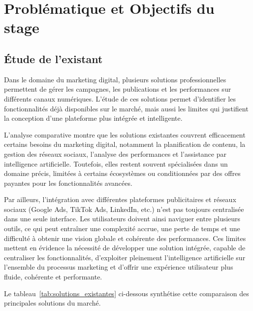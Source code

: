 \documentclass[12pt,a4paper]{report}
\numberwithin{figure}{chapter}
\numberwithin{table}{chapter}
\begin{document}
\section{Problématique et Objectifs du stage}

\subsection{Étude de l’existant}

Dans le domaine du marketing digital, plusieurs solutions professionnelles permettent de gérer les campagnes, les publications et les performances sur différents canaux numériques. L’étude de ces solutions permet d’identifier les fonctionnalités déjà disponibles sur le marché, mais aussi les limites qui justifient la conception d’une plateforme plus intégrée et intelligente.

L’analyse comparative montre que les solutions existantes couvrent efficacement certains besoins du marketing digital, notamment la planification de contenu, la gestion des réseaux sociaux, l’analyse des performances et l’assistance par intelligence artificielle. Toutefois, elles restent souvent spécialisées dans un domaine précis, limitées à certains écosystèmes ou conditionnées par des offres payantes pour les fonctionnalités avancées.

Par ailleurs, l’intégration avec différentes plateformes publicitaires et réseaux sociaux (Google Ads, TikTok Ads, LinkedIn, etc.) n’est pas toujours centralisée dans une seule interface. Les utilisateurs doivent ainsi naviguer entre plusieurs outils, ce qui peut entraîner une complexité accrue, une perte de temps et une difficulté à obtenir une vision globale et cohérente des performances. Ces limites mettent en évidence la nécessité de développer une solution intégrée, capable de centraliser les fonctionnalités, d’exploiter pleinement l’intelligence artificielle sur l’ensemble du processus marketing et d’offrir une expérience utilisateur plus fluide, cohérente et performante.

Le tableau~\ref{tab:solutions_existantes} ci-dessous synthétise cette comparaison des principales solutions du marché.
\end{document}
